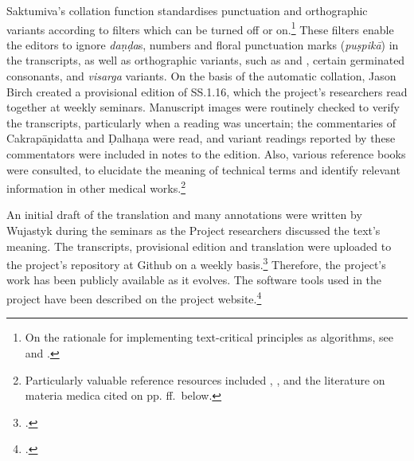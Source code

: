 Saktumiva's  collation function standardises punctuation and orthographic
variants according to filters which can be turned off or on.\footnote{On the
    rationale for implementing text-critical principles as algorithms, see
    \cite{li-2017} and \cite[\S 4.4]{li-2018}.} These filters enable the editors to ignore
    \emph{daṇḍa}s, numbers and floral punctuation marks (\emph{puṣpikā}) in the
    transcripts, as well as orthographic variants, such as  and ,
    certain germinated consonants, and \emph{visarga} variants. On the basis of
    the automatic collation, Jason Birch created a provisional edition of SS.1.16,
    which the project's researchers read together at weekly seminars. Manuscript
    images were routinely checked to verify the transcripts, particularly when a
    reading was uncertain; the commentaries of Cakrapāṇidatta and Ḍalhaṇa were
    read, and variant readings reported by these commentators were included in
    notes to the edition. Also, various reference books were consulted, to
    elucidate the meaning of technical terms and identify relevant information in
    other medical works.\footnote{Particularly valuable reference resources
        included \citet{josi-maha}, \citet{meul-hist}, and the literature on
        materia medica cited on pp.\,\pageref{botanicalsourcebooks}\,ff.\ below.}

An initial draft of the translation and many annotations were written by
Wujastyk during the seminars as the Project researchers discussed the text's
meaning. The transcripts, provisional edition and translation were uploaded to
the project's repository at Github on a weekly basis.\footcite{wuja-2021c}
Therefore, the project's work has been publicly available as it evolves. The
software tools used in the project have been described on the project
website.\footcite[“The toolbox”]{wuja-2021b}

